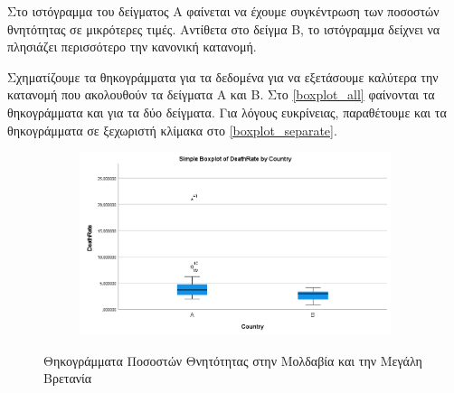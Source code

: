 \documentclass{article}
\begin{document}
    Στο ιστόγραμμα του δείγματος Α φαίνεται να έχουμε συγκέντρωση των ποσοστών θνητότητας σε μικρότερες τιμές. Αντίθετα στο δείγμα Β, το ιστόγραμμα δείχνει να πλησιάζει περισσότερο την κανονική κατανομή.
    
    Σχηματίζουμε τα θηκογράμματα για τα δεδομένα για να εξετάσουμε καλύτερα την κατανομή που ακολουθούν τα δείγματα Α και Β. Στο \autoref{boxplot_all} φαίνονται τα θηκογράμματα και για τα δύο δείγματα. Για λόγους ευκρίνειας, παραθέτουμε και τα θηκογράμματα σε ξεχωριστή κλίμακα στο \autoref{boxplot_separate}.
    
    \begin{figure}[H]
        \centering
    	\begin{adjustbox}{center}
    		\begin{subfigure}[c]{1\textwidth}    
    			\includegraphics[width=1\textwidth,height=\textheight,keepaspectratio]{media/2/boxplot_together.png}
    		\end{subfigure}%
    	\end{adjustbox}
    	\caption{Θηκογράμματα Ποσοστών Θνητότητας στην Μολδαβία και την Μεγάλη Βρετανία}
        \label{boxplot_all}
    \end{figure}
    
\end{document}
